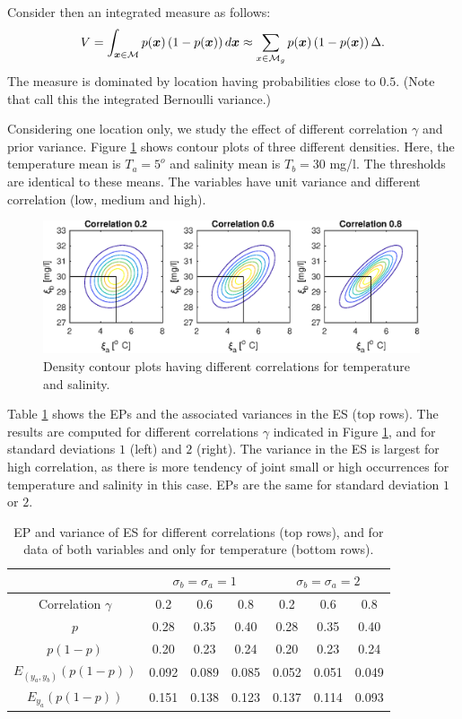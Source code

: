 \documentclass[aoas]{imsart}
\begin{document}
Consider then an integrated measure as follows:
\begin{equation}\label{measVAR}
    V = \int_{\bx \in \mathcal{M}} p(\bx) \left(1-p(\bx)\right) d\bx \approx \sum_{x \in \mathcal{M}_g} p(\bx) \left(1-p(\bx)\right) \Delta.
\end{equation}
The measure is dominated by location having probabilities close to $0.5$. 
(Note that \cite{Bect2019} call this the integrated Bernoulli variance.)

Considering one location only, we study the effect of different correlation $\gamma$ and prior variance. 
Figure \ref{illus_bivarDens} shows contour plots of three different densities. Here, the temperature mean is $T_a=5^o$ and salinity mean is $T_b=30$ mg/l. The thresholds are identical to these means. The variables have unit variance and different correlation (low, medium and high).
\begin{figure}[h!]
\centering
\includegraphics[width=0.99\textwidth]{Figures/illus_bivar.eps}
\caption{Density contour plots having different correlations for temperature and salinity.}\label{illus_bivarDens}
\end{figure}
Table \ref{tab:sim_rhoab} shows the EPs and the associated variances in the ES (top rows). The results are computed for different correlations $\gamma$ indicated in Figure \ref{illus_bivarDens}, and for standard deviations $1$ (left) and $2$ (right). The variance in the ES is largest for high correlation, as there is more tendency of joint small or high occurrences for temperature and salinity in this case. EPs are the same for standard deviation $1$ or $2$. 
\begin{table}[!h]
\centering
\caption{EP and variance of ES for different correlations (top rows), and for data of both variables and only for temperature (bottom rows).}
\begin{tabular}{c|ccc|ccc}
 &\multicolumn{3}{c}{$\sigma_b=\sigma_a=1$} & \multicolumn{3}{c}{$\sigma_b=\sigma_a=2$} \\
\hline
Correlation $\gamma$ & 0.2 & 0.6 & 0.8 & 0.2 & 0.6 & 0.8 \\
\hline
$p$ & 0.28 & 0.35 & 0.40 & 0.28 & 0.35 & 0.40 \\ 
$p(1-p)$ & 0.20 & 0.23 & 0.24 & 0.20 & 0.23 & 0.24 \\ 
$E_{(y_a,y_b)}(p (1-p))$ & 0.092 & 0.089 & 0.085 & 0.052 & 0.051 & 0.049 \\ 
$E_{y_a}(p (1-p))$ & 0.151 & 0.138 & 0.123 & 0.137 & 0.114 & 0.093 \\ 
\hline
\end{tabular}
\label{tab:sim_rhoab}
\end{table}
\end{document}
